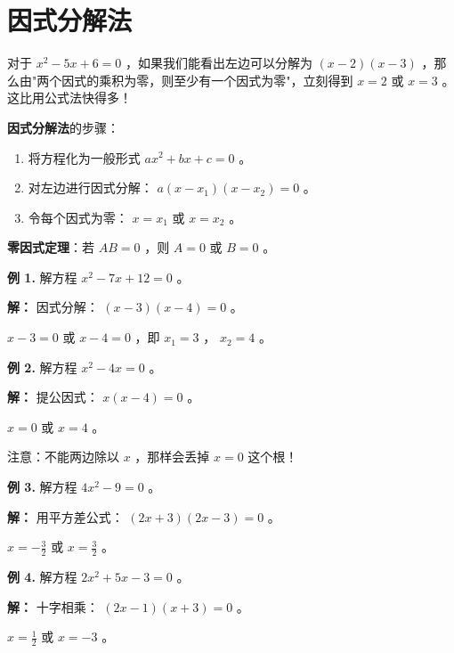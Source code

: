 \section*{因式分解法}


\begin{explore}


对于 $x^2 - 5x + 6 = 0$ ，如果我们能看出左边可以分解为 $(x-2)(x-3)$ ，那么由"两个因式的乘积为零，则至少有一个因式为零"，立刻得到 $x = 2$ 或 $x = 3$ 。这比用公式法快得多！

\end{explore}

\begin{understand}


\textbf{因式分解法}的步骤：

\begin{enumerate}
  \item 将方程化为一般形式 $ax^2 + bx + c = 0$ 。
  \item 对左边进行因式分解： $a(x - x_1)(x - x_2) = 0$ 。
  \item 令每个因式为零： $x = x_1$ 或 $x = x_2$ 。
\end{enumerate}


\textbf{零因式定理}：若 $AB = 0$ ，则 $A = 0$ 或 $B = 0$ 。

\end{understand}

\begin{workedexamples}


\textbf{例 1.} 解方程 $x^2 - 7x + 12 = 0$ 。

\textbf{解：} 因式分解： $(x - 3)(x - 4) = 0$ 。

$x - 3 = 0$ 或 $x - 4 = 0$ ，即 $x_1 = 3$ ， $x_2 = 4$ 。

\textbf{例 2.} 解方程 $x^2 - 4x = 0$ 。

\textbf{解：} 提公因式： $x(x - 4) = 0$ 。

$x = 0$ 或 $x = 4$ 。

注意：不能两边除以 $x$ ，那样会丢掉 $x = 0$ 这个根！

\textbf{例 3.} 解方程 $4x^2 - 9 = 0$ 。

\textbf{解：} 用平方差公式： $(2x + 3)(2x - 3) = 0$ 。

$x = -\frac{3}{2}$ 或 $x = \frac{3}{2}$ 。

\textbf{例 4.} 解方程 $2x^2 + 5x - 3 = 0$ 。

\textbf{解：} 十字相乘： $(2x - 1)(x + 3) = 0$ 。

$x = \frac{1}{2}$ 或 $x = -3$ 。

\end{workedexamples}

